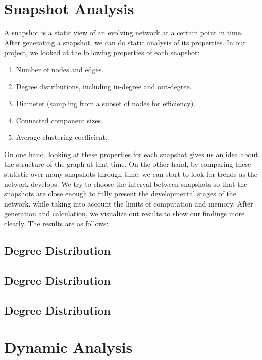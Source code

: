 \documentclass[10pt]{article}
\begin{document}
\begin{multicols}{2}
\section{Snapshot Analysis}
\vspace{10pt}

A snapshot is a static view of an evolving network at a certain point in time. After generating a snapshot, we can do static analysis of its properties. In our project, we looked at the following properties of each snapshot:
\begin{enumerate}
\item Number of nodes and edges.
\item Degree distributions, including in-degree and out-degree.
\item Diameter (sampling from a subset of nodes for efficiency).
\item Connected component sizes.
\item Average clustering coefficient.
\end{enumerate}

On one hand, looking at these properties for each snapshot gives us an idea about the structure of the graph at that time. On the other hand, by comparing these statistic over many snapshots through time, we can start to look for trends as the network develops. We try to choose the interval between snapshots so that the snapshots are close enough to fully present the developmental stages of the network, while taking into account the limits of computation and memory. After generation and calculation, we visualize out results to show our findings more clearly. The results are as follows:

\subsection{Degree Distribution}

\subsection{Degree Distribution}

\subsection{Degree Distribution}


\section{Dynamic Analysis}
\vspace{10pt}


\end{multicols}
\end{document}
